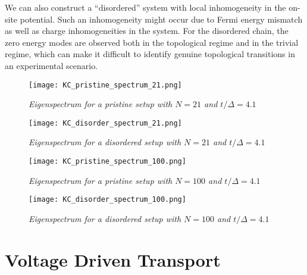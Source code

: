 \vspace{1cm}

We can also construct a ``disordered'' system with local inhomogeneity in the on-site potential. Such an inhomogeneity might occur due to Fermi energy mismatch as well as charge inhomogeneities in the system. For the disordered chain, the zero energy modes are observed both in the topological regime and in the trivial regime, which can make it difficult to identify genuine topological transitions in an experimental scenario.

\clearpage

\vspace*{2cm}

\begin{figure}[!htbp]
\centering
\texttt{[image: KC\_pristine\_spectrum\_21.png]}
\caption{\textit{Eigenspectrum for a pristine setup with $N = 21$ and $t/\Delta = 4.1$}}
\vspace{1cm}
\texttt{[image: KC\_disorder\_spectrum\_21.png]}
\caption{\textit{Eigenspectrum for a disordered setup with $N = 21$ and $t/\Delta = 4.1$}}
\end{figure}    

\clearpage

\vspace*{2cm}

\begin{figure}[!htbp]
\centering
\texttt{[image: KC\_pristine\_spectrum\_100.png]}
\caption{\textit{Eigenspectrum for a pristine setup with $N = 100$ and $t/\Delta = 4.1$}}
\vspace{1cm}
\texttt{[image: KC\_disorder\_spectrum\_100.png]}
\caption{\textit{Eigenspectrum for a disordered setup with $N = 100$ and $t/\Delta = 4.1$}}
\end{figure} 

\clearpage

\section{Voltage Driven Transport}